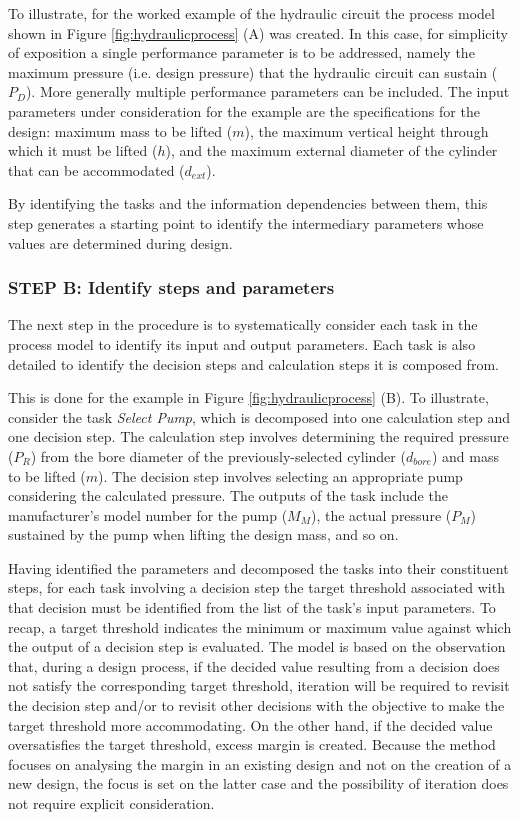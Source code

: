 To illustrate, for the worked example of the hydraulic circuit the process model shown in Figure \ref{fig:hydraulicprocess} (A) was created. In this case, for simplicity of exposition a single performance parameter is to be addressed, namely the maximum pressure (i.e. design pressure) that the hydraulic circuit can sustain ($P_D$). More generally multiple performance parameters can be included. The input parameters under consideration for the example are the specifications for the design: maximum mass to be lifted ($m$), the maximum vertical height through which it must be lifted ($h$), and the maximum external diameter of the cylinder that can be accommodated ($d_{ext}$).

By identifying the tasks and the information dependencies between them, this step generates a starting point to identify the intermediary parameters whose values are determined during design.

\subsubsection{STEP B: Identify steps and parameters}

The next step in the procedure is to systematically consider each task in the process model to identify its input and output parameters. Each task is also detailed to identify the decision steps and calculation steps it is composed from. 

This is done for the example in Figure \ref{fig:hydraulicprocess} (B). To illustrate, consider the task \emph{Select Pump}, which is decomposed into one calculation step and one decision step. The calculation step involves determining the required pressure ($P_{R}$) from the bore diameter of the previously-selected cylinder ($d_{bore}$) and mass to be lifted ($m$). The decision step involves selecting an appropriate pump considering the calculated pressure. The outputs of the task include the manufacturer's model number for the pump ($M_{M}$), the actual pressure ($P_{M}$) sustained by the pump when lifting the design mass, and so on. 

Having identified the parameters and decomposed the tasks into their constituent steps, for each task involving a decision step the target threshold associated with that decision must be identified from the list of the task's input parameters. To recap, a target threshold indicates the minimum or maximum value against which the output of a decision step is evaluated. The model is based on the observation that, during a design process, if the decided value resulting from a decision does not satisfy the corresponding target threshold, iteration will be required to revisit the decision step and/or to revisit other decisions with the objective to make the target threshold more accommodating. On the other hand, if the decided value oversatisfies the target threshold, excess margin is created. Because the method focuses on analysing the margin in an existing design and not on the creation of a new design, the focus is set on the latter case and the possibility of iteration does not require explicit consideration.

